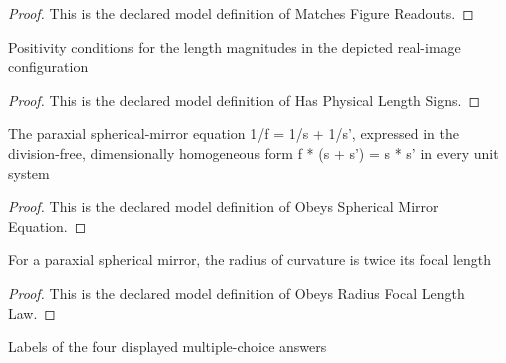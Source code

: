 \begin{proof}
  This is the declared model definition of Matches Figure Readouts.
\end{proof}
\begin{definition}
  \label{def:physics:phyx-mini-0038:phyxminiproblems-problemphyxmini0038-hasphysicallengthsigns}
  Positivity conditions for the length magnitudes in the depicted real-image configuration
\end{definition}
\begin{proof}
  This is the declared model definition of Has Physical Length Signs.
\end{proof}
\begin{definition}
  \label{def:physics:phyx-mini-0038:phyxminiproblems-problemphyxmini0038-obeyssphericalmirrorequation}
  The paraxial spherical-mirror equation 1/f = 1/s + 1/s', expressed in the division-free, dimensionally homogeneous form f * (s + s') = s * s' in every unit system
\end{definition}
\begin{proof}
  This is the declared model definition of Obeys Spherical Mirror Equation.
\end{proof}
\begin{definition}
  \label{def:physics:phyx-mini-0038:phyxminiproblems-problemphyxmini0038-obeysradiusfocallengthlaw}
  For a paraxial spherical mirror, the radius of curvature is twice its focal length
\end{definition}
\begin{proof}
  This is the declared model definition of Obeys Radius Focal Length Law.
\end{proof}
\begin{definition}
  \label{def:physics:phyx-mini-0038:phyxminiproblems-problemphyxmini0038-answerchoice}
  Labels of the four displayed multiple-choice answers
\end{definition}

